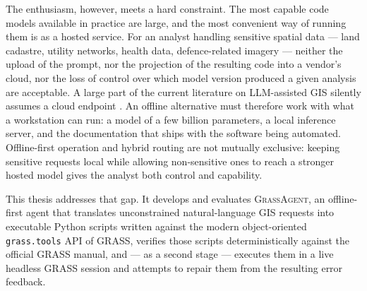 The enthusiasm, however, meets a hard constraint. The most capable code models
available in practice are large, and the most convenient way of running them is
as a hosted service. For an analyst handling sensitive spatial data --- land
cadastre, utility networks, health data, defence-related imagery --- neither the
upload of the prompt, nor the projection of the resulting code into a vendor's
cloud, nor the loss of control over which model version produced a given
analysis are acceptable. A large part of the current literature on LLM-assisted
GIS silently assumes a cloud endpoint \cite{mansourian2024chatgeoai,singh2024geollmengine}.
An offline alternative must therefore work with what a workstation can run: a
model of a few billion parameters, a local inference server, and the
documentation that ships with the software being automated. Offline-first
operation and hybrid routing are not mutually exclusive: keeping sensitive
requests local while allowing non-sensitive ones to reach a stronger hosted
model gives the analyst both control and capability.

This thesis addresses that gap. It develops and evaluates \textsc{GrassAgent},
an offline-first agent that translates unconstrained natural-language GIS
requests into executable Python scripts written against the modern
object-oriented \texttt{grass.tools} API of GRASS, verifies those scripts
deterministically against the official GRASS manual, and --- as a second stage
--- executes them in a live headless GRASS session and attempts to repair them
from the resulting error feedback.

